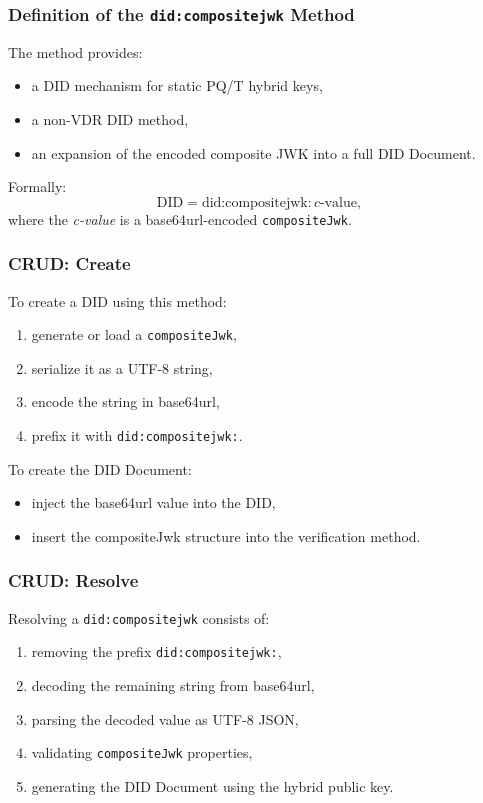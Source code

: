 \subsubsection*{Definition of the \texttt{did:compositejwk} Method}
The method provides:
\begin{itemize}
    \item a DID mechanism for static PQ/T hybrid keys,
    \item a non-VDR DID method,
    \item an expansion of the encoded composite JWK into a full DID Document.
\end{itemize}

\noindent
Formally:
\[
\text{DID} = \text{did:compositejwk:}\,c\text{-value},
\]
where the \emph{c-value} is a base64url-encoded \texttt{compositeJwk}.

\subsubsection*{CRUD: Create}

\noindent
To create a DID using this method:
\begin{enumerate}
    \item generate or load a \texttt{compositeJwk},
    \item serialize it as a UTF-8 string,
    \item encode the string in base64url,
    \item prefix it with \texttt{did:compositejwk:}.
\end{enumerate}

\noindent
To create the DID Document:
\begin{itemize}
    \item inject the base64url value into the DID,
    \item insert the compositeJwk structure into the verification method.
\end{itemize}

\subsubsection*{CRUD: Resolve}

Resolving a \texttt{did:compositejwk} consists of:
\begin{enumerate}
    \item removing the prefix \texttt{did:compositejwk:},
    \item decoding the remaining string from base64url,
    \item parsing the decoded value as UTF-8 JSON,
    \item validating \texttt{compositeJwk} properties,
    \item generating the DID Document using the hybrid public key.
\end{enumerate}

